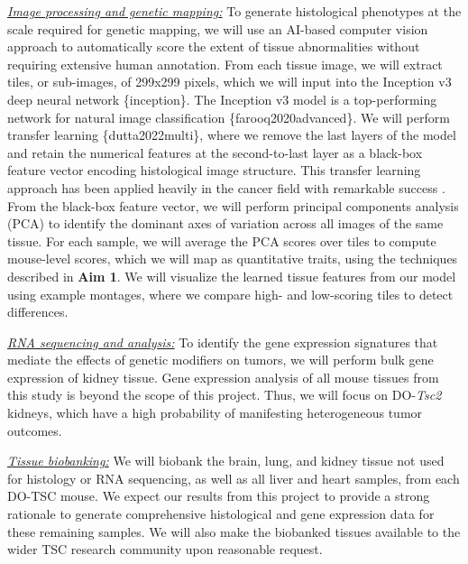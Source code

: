 \documentclass[
  12pt,
]{article}
\begin{document}
\textit{\underline{Image processing and genetic mapping:}} To generate
histological phenotypes at the scale required for genetic mapping, we
will use an AI-based computer vision approach to automatically score the
extent of tissue abnormalities without requiring extensive human
annotation. From each tissue image, we will extract tiles, or
sub-images, of 299x299 pixels, which we will input into the Inception v3
deep neural network \{inception\}. The Inception v3 model is a
top-performing network for natural image classification
\{farooq2020advanced\}. We will perform transfer learning
\{dutta2022multi\}, where we remove the last layers of the model and
retain the numerical features at the second-to-last layer as a black-box
feature vector encoding histological image structure. This transfer
learning approach has been applied heavily in the cancer field with
remarkable success \cite{31010833, 32968067}. From the black-box feature
vector, we will perform principal components analysis (PCA) to identify
the dominant axes of variation across all images of the same tissue. For
each sample, we will average the PCA scores over tiles to compute
mouse-level scores, which we will map as quantitative traits, using the
techniques described in \textbf{Aim 1}. We will visualize the learned
tissue features from our model using example montages, where we compare
high- and low-scoring tiles to detect differences.

\textit{\underline{RNA sequencing and analysis:}} To identify the gene
expression signatures that mediate the effects of genetic modifiers on
tumors, we will perform bulk gene expression of kidney tissue. Gene
expression analysis of all mouse tissues from this study is beyond the
scope of this project. Thus, we will focus on DO-\textit{Tsc2} kidneys,
which have a high probability of manifesting heterogeneous tumor
outcomes.

\textit{\underline{Tissue biobanking:}} We will biobank the brain, lung,
and kidney tissue not used for histology or RNA sequencing, as well as
all liver and heart samples, from each DO-TSC mouse. We expect our
results from this project to provide a strong rationale to generate
comprehensive histological and gene expression data for these remaining
samples. We will also make the biobanked tissues available to the wider
TSC research community upon reasonable request.
\end{document}
